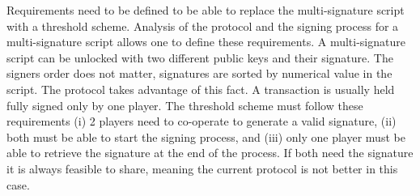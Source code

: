 Requirements need to be defined to be able to replace the multi-signature script
with a threshold scheme. Analysis of the protocol and the signing process for a
multi-signature script allows one to define these requirements. A multi-signature
script can be unlocked with two different public keys and their signature. The
signers order does not matter, signatures are sorted by numerical value in the script.
The protocol takes advantage of this fact. A transaction is usually held fully signed
only by one player. The threshold scheme must follow these requirements (i) 2
players need to co-operate to generate a valid signature, (ii) both must be able
to start the signing process, and (iii) only one player must be able to retrieve
the signature at the end of the process. If both need the signature it is
always feasible to share, meaning the current protocol is not better in this case.

